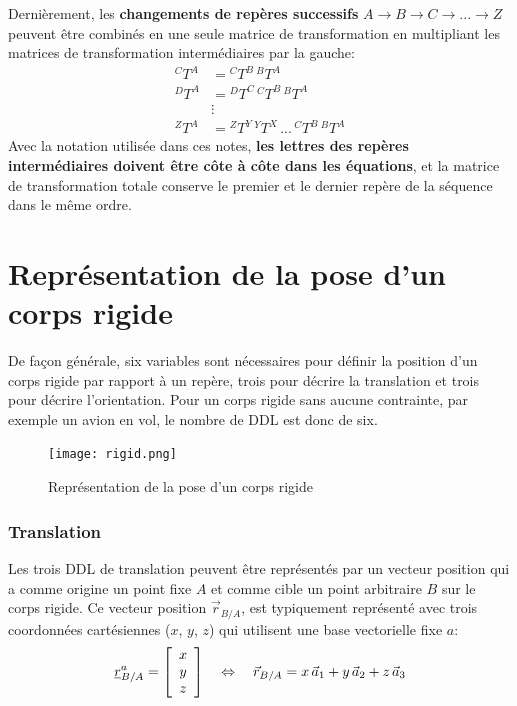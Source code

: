 Dernièrement, les \textbf{changements de repères successifs} $A \rightarrow B \rightarrow C \rightarrow ... \rightarrow Z$  peuvent être combinés en une seule matrice de transformation en multipliant les matrices de transformation intermédiaires par la gauche:
\begin{align}
{}^CT^A &=  {}^CT^B \, {}^BT^A \\
{}^DT^A &=  {}^DT^C \, {}^CT^B \, {}^BT^A \\
& \vdots \nonumber \\
{}^ZT^A &= {}^ZT^Y \, {}^YT^X \, ... \, {}^CT^B \,  {}^BT^A
\end{align}
Avec la notation utilisée dans ces notes, \textbf{les lettres des repères intermédiaires doivent être côte à côte dans les équations}, et la matrice de transformation totale conserve le premier et le dernier repère de la séquence dans le même ordre.




\newpage
\section{Représentation de la pose d'un corps rigide}
\label{sec:corps}

De façon générale, six variables sont nécessaires pour définir la position d'un corps rigide par rapport à un repère, trois pour décrire la translation et trois pour décrire l'orientation. Pour un corps rigide sans aucune contrainte, par exemple un avion en vol, le nombre de DDL est donc de six.

\begin{figure}[H]
	\centering
	\texttt{[image: rigid.png]}
	\caption{Représentation de la pose d'un corps rigide}
	\label{fig:rigid}
\end{figure}

\subsubsection{Translation}
%
Les trois DDL de translation peuvent être représentés par un vecteur position qui a comme origine un point fixe $A$ et comme cible un point arbitraire $B$ sur le corps rigide. Ce vecteur position $\vec{r}_{B/A}$, est typiquement représenté avec trois coordonnées cartésiennes ($x$, $y$, $z$) qui utilisent une base vectorielle fixe $a$:
\begin{equation}
	\underline{r}_{B/A}^a = \left[ \begin{array}{c} x \\  y \\ z  \end{array} \right]
	\quad \Leftrightarrow  \quad
	\vec{r}_{B/A} = x \, \vec{a}_1 + y \, \vec{a}_2 + z \, \vec{a}_3
\end{equation}

